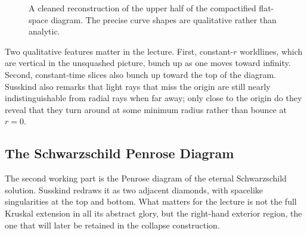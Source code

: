 \begin{figure}[ht]
\centering
{}
\caption{A cleaned reconstruction of the upper half of the compactified flat-space diagram. The precise curve shapes are qualitative rather than analytic.}
\end{figure}

Two qualitative features matter in the lecture. First, constant-\(r\) worldlines, which are vertical in the unsquashed picture, bunch up as one moves toward infinity. Second, constant-time slices also bunch up toward the top of the diagram. Susskind also remarks that light rays that miss the origin are still nearly indistinguishable from radial rays when far away; only close to the origin do they reveal that they turn around at some minimum radius rather than bounce at \(r=0\).

\subsection{The Schwarzschild Penrose Diagram}

The second working part is the Penrose diagram of the eternal Schwarzschild solution. Susskind redraws it as two adjacent diamonds, with spacelike singularities at the top and bottom. What matters for the lecture is not the full Kruskal extension in all its abstract glory, but the right-hand exterior region, the one that will later be retained in the collapse construction.


